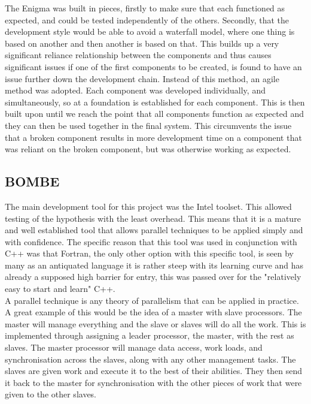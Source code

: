 \documentclass[12pt,a4paper]{article}
\begin{document}
The Enigma was built in pieces, firstly to make sure that each functioned as expected, and could be tested independently of the others. Secondly, that the development style would be able to avoid a waterfall model, where one thing is based on another and then another is based on that. This builds up a very significant reliance relationship between the components and thus causes significant issues if one of the first components to be created, is found to have an issue further down the development chain. Instead of this method, an agile method was adopted. Each component was developed individually, and simultaneously, so at a foundation is established for each component. This is then built upon until we reach the point that all components function as expected and they can then be used together in the final system. This circumvents the issue that a broken component results in more development time on a component that was reliant on the broken component, but was otherwise working as expected.

\subsection{BOMBE}

The main development tool for this project was the Intel toolset. This allowed testing of the hypothesis with the least overhead. This means that it is a mature and well established tool that allows parallel techniques to be applied simply and with confidence. The specific reason that this tool was used in conjunction with C++ was that Fortran, the only other option with this specific tool, is seen by many as an antiquated language it is rather steep with its learning curve and has already a supposed high barrier for entry, this was passed over for the "relatively easy to start and learn" C++.\\

A parallel technique is any theory of parallelism that can be applied in practice. A great example of this would be the idea of a master with slave processors. The master will manage everything and the slave or slaves will do all the work. This is implemented through assigning a leader processor, the master, with the rest as slaves. The master processor will manage data access, work loads, and synchronisation across the slaves, along with any other management tasks. The slaves are given work and execute it to the best of their abilities. They then send it back to the master for synchronisation with the other pieces of work that were given to the other slaves.
\end{document}
